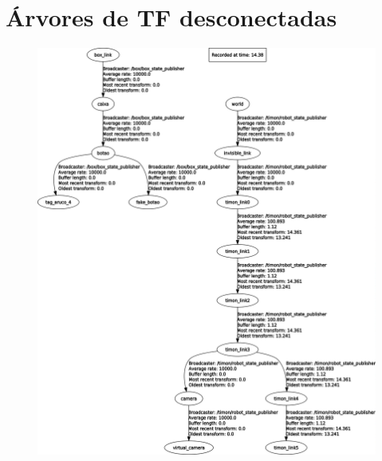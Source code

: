 \documentclass[
12pt,					%
openright,				%
twoside,				%
a4paper,				%
english,
brazil
]{ABNT/abntex2_report}
\begin{document}
	\chapter{Árvores de TF desconectadas}
	\label{apend:tf1}
	\begin{figure}[H]
		\centering
		\includegraphics[scale=0.39]{appendix/tf_desconectadas.png}
	\end{figure}
\end{document}
